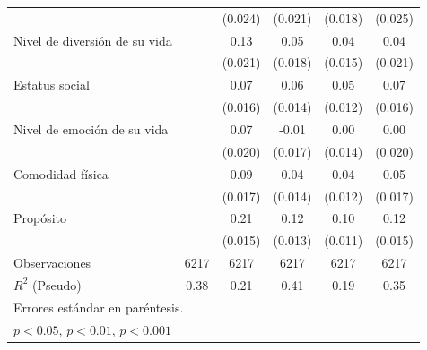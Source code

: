 \documentclass[12pt,spanish]{article}
\begin{document}
\begin{table}[H]
{\begin{tabular}{l*{5}{c}}
            &                     &     (0.024)         &     (0.021)         &     (0.018)         &     (0.025)         \\
[1em]
Nivel de diversión de su vida&                     &        0.13\sym{***}&        0.05\sym{*}  &        0.04\sym{*}  &        0.04\sym{*}  \\
            &                     &     (0.021)         &     (0.018)         &     (0.015)         &     (0.021)         \\
[1em]
Estatus social&                     &        0.07\sym{***}&        0.06\sym{***}&        0.05\sym{***}&        0.07\sym{***}\\
            &                     &     (0.016)         &     (0.014)         &     (0.012)         &     (0.016)         \\
[1em]
Nivel de emoción de su vida&                     &        0.07\sym{***}&       -0.01         &        0.00         &        0.00         \\
            &                     &     (0.020)         &     (0.017)         &     (0.014)         &     (0.020)         \\
[1em]
Comodidad física&                     &        0.09\sym{***}&        0.04\sym{**} &        0.04\sym{**} &        0.05\sym{**} \\
            &                     &     (0.017)         &     (0.014)         &     (0.012)         &     (0.017)         \\
[1em]
Propósito &                     &        0.21\sym{***}&        0.12\sym{***}&        0.10\sym{***}&        0.12\sym{***}\\
            &                     &     (0.015)         &     (0.013)         &     (0.011)         &     (0.015)         \\
Observaciones       &        6217         &        6217         &        6217         &        6217         &        6217         \\
$R^2$ (Pseudo)   &        0.38         &        0.21         &        0.41         &             0.19        &                    0.35 \\
\hline\hline
\multicolumn{6}{l}{\footnotesize Errores estándar en paréntesis.}\\
\multicolumn{6}{l}{\footnotesize \sym{*} \(p<0.05\), \sym{**} \(p<0.01\), \sym{***} \(p<0.001\)}\\
\end{tabular}
}
    \label{tab:tab1}
\end{table}
\end{document}
